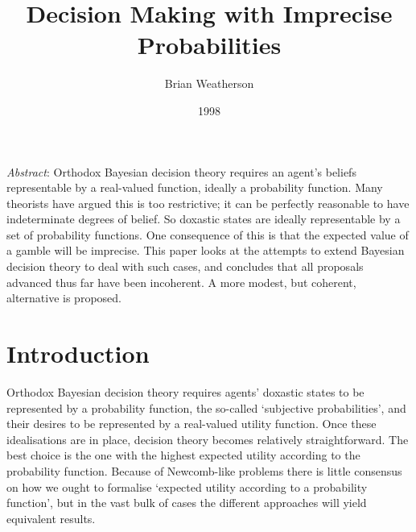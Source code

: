 \documentclass[
  11pt,
  letterpaper,
  DIV=11,
  numbers=noendperiod,
  twoside]{scrartcl}
\title{Decision Making with Imprecise Probabilities}
\author{Brian Weatherson}
\date{1998}
\renewenvironment{abstract}
 {\vspace{-1.25cm}
 \quotation\small\noindent\emph{Abstract}:}
 {\endquotation}
\begin{document}
\maketitle
\begin{abstract}
Orthodox Bayesian decision theory requires an agent's beliefs
representable by a real-valued function, ideally a probability function.
Many theorists have argued this is too restrictive; it can be perfectly
reasonable to have indeterminate degrees of belief. So doxastic states
are ideally representable by a set of probability functions. One
consequence of this is that the expected value of a gamble will be
imprecise. This paper looks at the attempts to extend Bayesian decision
theory to deal with such cases, and concludes that all proposals
advanced thus far have been incoherent. A more modest, but coherent,
alternative is proposed.
\end{abstract}


\section{Introduction}\label{introduction}

Orthodox Bayesian decision theory requires agents' doxastic states to be
represented by a probability function, the so-called `subjective
probabilities', and their desires to be represented by a real-valued
utility function. Once these idealisations are in place, decision theory
becomes relatively straightforward. The best choice is the one with the
highest expected utility according to the probability function. Because
of Newcomb-like problems there is little consensus on how we ought to
formalise `expected utility according to a probability function', but in
the vast bulk of cases the different approaches will yield equivalent
results.
\end{document}
